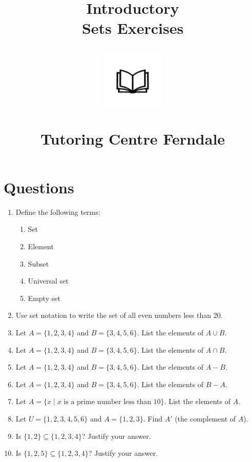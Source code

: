 \documentclass[12pt]{article}
\title{Introductory\\Sets Exercises\\
\begin{center}
\includegraphics[width=4em]{ApS_logo.png}
\end{center}
\begin{normalsize}Tutoring Centre Ferndale \end{normalsize}}
\author{}
\date{}
\begin{document}
\maketitle

\section*{Questions}

\begin{enumerate}
    \item Define the following terms:
    \begin{enumerate}
        \item Set
        \item Element
        \item Subset
        \item Universal set
        \item Empty set
    \end{enumerate}
    
    \item Use set notation to write the set of all even numbers less than 20.

    \item Let \( A = \{1, 2, 3, 4\} \) and \( B = \{3, 4, 5, 6\} \). List the elements of \( A \cup B \).

    \item Let \( A = \{1, 2, 3, 4\} \) and \( B = \{3, 4, 5, 6\} \). List the elements of \( A \cap B \).

    \item Let \( A = \{1, 2, 3, 4\} \) and \( B = \{3, 4, 5, 6\} \). List the elements of \( A - B \).

    \item Let \( A = \{1, 2, 3, 4\} \) and \( B = \{3, 4, 5, 6\} \). List the elements of \( B - A \).

    \item Let \( A = \{x \mid x \text{ is a prime number less than 10} \} \). List the elements of \( A \).

    \item Let \( U = \{1, 2, 3, 4, 5, 6\} \) and \( A = \{1, 2, 3\} \). Find \( A' \) (the complement of \( A \)).

    \item Is \( \{1, 2\} \subseteq \{1, 2, 3, 4\} \)? Justify your answer.

    \item Is \( \{1, 2, 5\} \subseteq \{1, 2, 3, 4\} \)? Justify your answer.


\end{enumerate}
\end{document}
